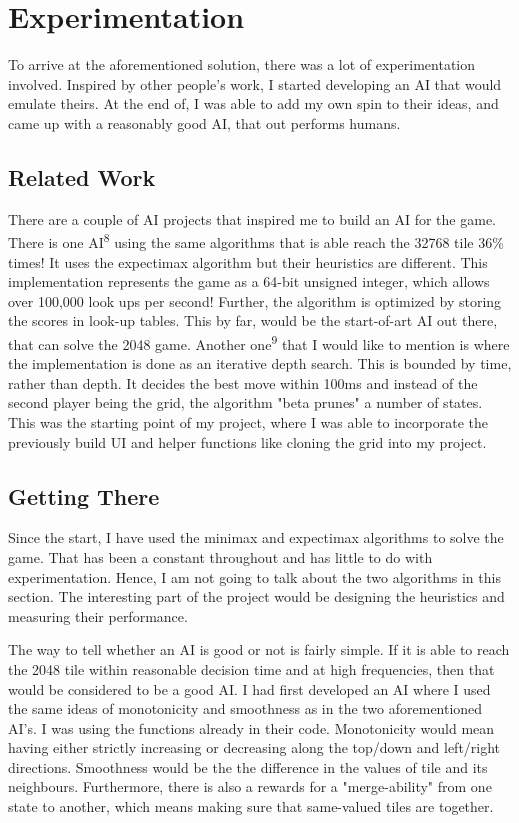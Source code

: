 \documentclass[english]{article}
\begin{document}
\section*{Experimentation}

To arrive at the aforementioned solution, there was a lot of experimentation involved. Inspired by other people's work, I started developing an AI that would emulate theirs. At the end of, I was able to add my own spin to their ideas, and came up with a reasonably good AI, that out performs humans.

\subsection*{Related Work}
There are a couple of AI projects that inspired me to build an AI for the game. There is one AI\textsuperscript{8} using the same algorithms that is able reach the 32768 tile 36\% times! It uses the expectimax algorithm but their heuristics are different. This implementation represents the game as a 64-bit unsigned integer, which allows over 100,000 look ups per second! Further, the algorithm is optimized by storing the scores in look-up tables. This by far, would be the start-of-art AI out there, that can solve the 2048 game.
Another one\textsuperscript{9} that I would like to mention is where the implementation is done as an iterative depth search. This is bounded by time, rather than depth. It decides the best move within 100ms and  instead of the second player being the grid, the algorithm "beta prunes" a number of states. This was the starting point of my project, where I was able to incorporate the previously build UI and helper functions like cloning the grid into my project.

\subsection*{Getting There}
Since the start, I have used the minimax and expectimax algorithms to solve the game. That has been a constant throughout and has little to do with experimentation. Hence, I am not going to talk about the two algorithms in this section. The interesting part of the project would be designing the heuristics and measuring their performance. 

The way to tell whether an AI is good or not is fairly simple. If it is able to reach the 2048 tile within reasonable decision time and at high frequencies, then that would be considered to be a good AI. I had first developed an AI where I used the same ideas of monotonicity and smoothness as in the two aforementioned AI's. I was using the functions already in their code. Monotonicity would mean having either strictly increasing or decreasing along the top/down and left/right directions. Smoothness would be the the difference in the values of tile and its neighbours. Furthermore, there is also a rewards for a "merge-ability" from one state to another, which means making sure that same-valued tiles are together. 
\end{document}
